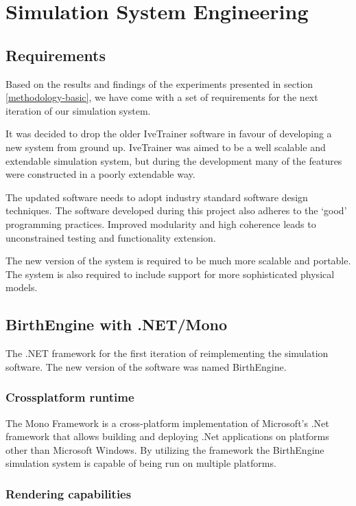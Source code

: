 \section{Simulation System Engineering}\label{methodology-software}

\subsection{Requirements}

Based on the results and findings of the experiments presented in section \ref{methodology-basic}, we have come with a set of requirements for the next iteration of our simulation system.

It was decided to drop the older IveTrainer software in favour of developing a new system from ground up. IveTrainer was aimed to be a well scalable and extendable simulation system, but during the development many of the features were constructed in a poorly extendable way.

The updated software needs to adopt industry standard software design techniques. The software developed during this project also adheres to the `good' programming practices. Improved modularity and high coherence leads to unconstrained testing and functionality extension.

The new version of the system is required to be much more scalable and portable. The system is also required to include support for more sophisticated physical models.

\subsection{BirthEngine with .NET/Mono}

The .NET framework for the first iteration of reimplementing the simulation software. The new version of the software was named BirthEngine.

\subsubsection{Crossplatform runtime}
  The Mono Framework \citep{mono_framework} is a cross-platform implementation of Microsoft's .Net framework that allows building and deploying .Net applications on platforms other than Microsoft Windows. By utilizing the framework the BirthEngine simulation system is capable of being run on multiple platforms.

\subsubsection{Rendering capabilities}

